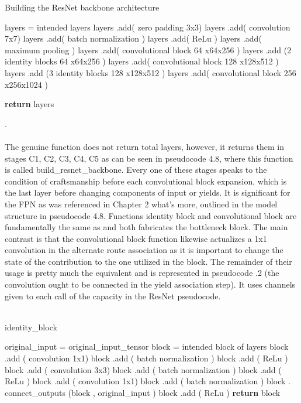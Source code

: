  \begin{algorithm}[H]
  \caption{Building the ResNet backbone architecture}
  \SetAlgoLined
  \DontPrintSemicolon
 layers = intended layers\;
 layers .add( zero padding 3x3)\;
 layers .add( convolution 7x7)\;   
 layers .add( batch normalization )\;
 layers .add( ReLu )\;
 layers .add( maximum pooling )\;
 layers .add( convolutional block 64 x64x256 )\;
 layers .add (2 identity blocks 64 x64x256 )\;
 layers .add( convolutional block 128 x128x512 )\;
 layers .add (3 identity blocks 128 x128x512 )\;
 layers .add( convolutional block 256 x256x1024 )\;


\textbf{return} layers\;   
 \end{algorithm}
.\\
\\
The genuine function does not return total layers, however, it returns them in stages  C1, C2, C3, C4, C5 as can be seen in pseudocode 4.8, where this function is called  build\_resnet\_backbone. Every one of these stages speaks to the condition of craftsmanship before each convolutional block expansion, which is the last layer before changing components of input or yields. It is significant for the FPN as was referenced in Chapter 2 what's more, outlined in the model structure in pseudocode 4.8. Functions identity block and convolutional block are fundamentally the same as and both fabricates the bottleneck block. The main contrast is that the convolutional block function likewise actualizes a 1x1 convolution in the alternate route association as it is important to change the state of the contribution to the one utilized in the block. The remainder of their usage is pretty much the equivalent and is represented in pseudocode .2 (the convolution ought to be connected in the yield association step). It uses channels given to each call of the capacity in the ResNet pseudocode.
\\
\\
\begin{algorithm}[H]
  \caption{identity\_block}
  \SetAlgoLined
  \DontPrintSemicolon
  original\_input = original\_input\_tensor\;
  block = intended block of layers\;
   block .add ( convolution 1x1)\;
   block .add ( batch normalization )\;
   block .add ( ReLu )\;
   block .add ( convolution 3x3)\;
   block .add ( batch normalization )\;
   block .add ( ReLu )\;
   block .add ( convolution 1x1)\;
    block .add ( batch normalization )\;
   block . connect\_outputs (block , original\_input )\;
   block .add ( ReLu )\;
   \textbf{return} block\;
  
  \end{algorithm}
